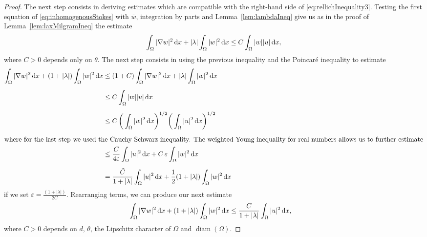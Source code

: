 \begin{proof}
  The next step consists in deriving estimates which are compatible with the right-hand side of \eqref{eq:rellichInequality3}.
  Testing the first equation of \eqref{eq:inhomogenousStokes} with $\overline w$, integration by parts and Lemma~\ref{lem:lambdaIneq} give us as in the proof of Lemma~\ref{lem:laxMilgramIneq} the estimate
  \begin{align*}
    \int_\Omega |\nabla w|^2 \, {\operatorname{d}\!{x}} + |\lambda| \int_\Omega |w|^2 \, {\operatorname{d}\!{x}} \leq C \int_\Omega |w| |u| \, {\operatorname{d}\!{x}},
  \end{align*}
  where $C > 0$ depends only on $\theta$.
  The next step consists in using the previous inequality and the Poincar\'{e} inequality to estimate
  \begin{align*}
    \int_\Omega |\nabla w|^2 \d x + (1 + |\lambda| ) \int_\Omega |w|^2 \d x 
    &\leq  (1 + C) \int_\Omega |\nabla w|^2 \d x + |\lambda| \int_\Omega |w|^2 \d x \\[0.5em]
    &\leq C \int_\Omega |w| |u| \d x \\[0.5em]
    &\leq C \, \bigg( \int_\Omega |w|^2 \d x \bigg)^{1/2} \bigg( \int_\Omega |u|^2 \d x \bigg)^{1/2}\\[0.5em]
    \intertext{where for the last step we used the Cauchy-Schwarz inequality. The weighted Young inequality for real numbers allows us to further estimate}
    &\leq \frac{C}{4\varepsilon} \int_\Omega |u|^2 \d x + C \, \varepsilon \int_\Omega |w|^2 \d x \\[0.5em]
    &= \frac{\tilde C}{1 + |\lambda|} \int_\Omega |u|^2 \d x + \frac{1}{2} ( 1 + |\lambda| ) \int_\Omega |w|^2 \d x
  \end{align*}
  if we set $\varepsilon = \frac{(1 + |\lambda|)}{2 C}$.
  Rearranging terms, we can produce our next estimate
  \begin{align}
    \int_\Omega |\nabla w|^2 \, {\operatorname{d}\!{x}} + ( 1 + |\lambda| ) \int_\Omega |w|^2 \, {\operatorname{d}\!{x}}
    &\leq \frac{C}{1 + |\lambda|} \int_\Omega |u|^2 \, {\operatorname{d}\!{x}},\label{eq:w2lambdaEstimate}
  \end{align}
  where $C > 0$ depends on $d$, $\theta$, the Lipschitz character of $\Omega$ and $\operatorname{diam}(\Omega)$.


\end{proof}
